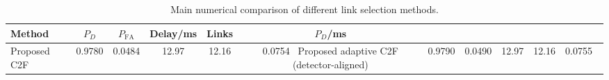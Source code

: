 \begin{table}[t]
    \centering
    \caption{Main numerical comparison of different link selection methods.}
    \label{tab:main_summary}
    \begin{tabular}{l c c c c c}
        \hline
        Method & $P_D$ & $P_{\mathrm{FA}}$ & Delay/ms & Links & $P_D$/ms \\
        \hline
        Proposed C2F & 0.9780 & 0.0484 & 12.97 & 12.16 & 0.0754 \
        Proposed adaptive C2F (detector-aligned) & 0.9790 & 0.0490 & 12.97 & 12.16 & 0.0755 \
        \hline
    \end{tabular}
\end{table}
